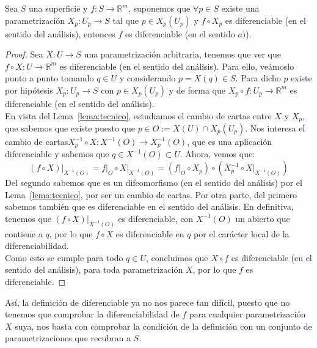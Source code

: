 \begin{coro}\label{coro:recubrimiento}
    Sea $S$ una superficie y $f:S\to \mathbb{R}^m$, suponemos que $\forall p\in S$ existe una parametrización $X_p:U_p\to S$ tal que $p\in X_p(U_p)$ y $f\circ X_p$ es diferenciable (en el sentido del análisis), entonces $f$ es diferenciable (en el sentido $a)$).
    \begin{proof}
        Sea $X:U\to S$ una parametrización arbitraria, tenemos que ver que $f\circ X:U\to \mathbb{R}^m$ es diferenciable (en el sentido del análisis). Para ello, veámoslo punto a punto tomando $q\in U$ y considerando $p = X(q)\in S$. Para dicho $p$ existe por hipótesis $X_p:U_p\to S$ con $p \in X_p(U_p)$ y de forma que $X_p\circ f:U_p\to \mathbb{R}^m$ es diferenciable (en el sentido del análisis).\\

        \noindent
        En vista del Lema~\ref{lema:tecnico}, estudiamos el cambio de cartas entre $X$ y $X_p$, que sabemos que existe puesto que $p \in O := X(U)\cap X_p(U_p)$. Nos interesa el cambio de cartas\newline $X_p^{-1}\circ X:X^{-1}(O)\to X_p^{-1}(O)$, que es una aplicación diferenciable y sabemos que $q\in X^{-1}(O)\subset U$. Ahora, vemos que:
        \begin{equation*}
            (f\circ X)\big|_{X^{-1}(O)} = f\big|_O \circ X\big|_{X^{-1}(O)} = (f\big|_O \circ X_p)\circ (X_p^{-1}\circ X\big|_{X^{-1}(O)})
        \end{equation*}
        Del segundo sabemos que es un difeomorfismo (en el sentido del análisis) por el Lema~\ref{lema:tecnico}, por ser un cambio de cartas. Por otra parte, del primero sabemos también que es diferenciable en el sentido del análisis. En definitiva, tenemos que $(f\circ X)\big|_{X^{-1}(O)}$ es diferenciable, con $X^{-1}(O)$ un abierto que contiene a $q$, por lo que $f\circ X$ es diferenciable en $q$ por el carácter local de la diferenciabilidad.\\

        \noindent
        Como esto se cumple para todo $q\in U$, concluimos que $X\circ f$ es diferenciable (en el sentido del análisis), para toda parametrización $X$, por lo que $f$ es diferenciable.
    \end{proof}
\end{coro}

\noindent
Así, la definición de diferenciable ya no nos parece tan difícil, puesto que no tenemos que comprobar la diferenciabilidad de $f$ para cualquier parametrización $X$ suya, nos basta con comprobar la condición de la definición con un conjunto de parametrizaciones que recubran a $S$.

